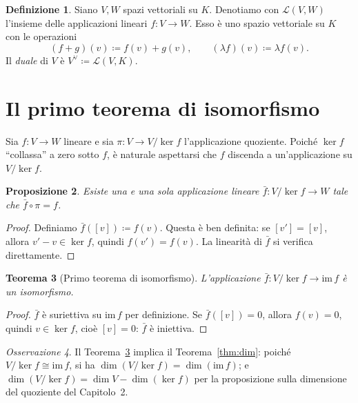 \documentclass[11pt, a4paper]{book}
\theoremstyle{definition}
\newtheorem{definizione}{Definizione}[section]
\theoremstyle{plain}
\newtheorem{teorema}[definizione]{Teorema}
\newtheorem{proposizione}[definizione]{Proposizione}
\theoremstyle{remark}
\newtheorem{osservazione}[definizione]{Osservazione}
\newcommand{\im}{\mathrm{im}\,}
\begin{document}
\begin{defbox}
\begin{definizione}
Siano $V, W$ spazi vettoriali su $K$. Denotiamo con $\mathcal{L}(V, W)$ l'insieme delle applicazioni lineari $f \colon V \to W$. Esso è uno spazio vettoriale su $K$ con le operazioni
\[
  (f+g)(v) \coloneqq f(v) + g(v), \qquad (\lambda f)(v) \coloneqq \lambda f(v).
\]
Il \emph{duale} di $V$ è $V^\vee \coloneqq \mathcal{L}(V, K)$.
\end{definizione}
\end{defbox}

\section{Il primo teorema di isomorfismo}
\label{sec:primoisomorf}

Sia $f \colon V \to W$ lineare e sia $\pi \colon V \to V/\ker f$ l'applicazione quoziente. Poiché $\ker f$ ``collassa'' a zero sotto $f$, è naturale aspettarsi che $f$ discenda a un'applicazione su $V/\ker f$.

\begin{proposizione}
Esiste una e una sola applicazione lineare $\bar{f} \colon V/\ker f \to W$ tale che $\bar{f} \circ \pi = f$.
\end{proposizione}

\begin{proof}
Definiamo $\bar{f}([v]) \coloneqq f(v)$. Questa è ben definita: se $[v'] = [v]$, allora $v' - v \in \ker f$, quindi $f(v') = f(v)$. La linearità di $\bar{f}$ si verifica direttamente.
\end{proof}

\begin{teorema}[Primo teorema di isomorfismo]
\label{thm:iso}
L'applicazione $\bar{f} \colon V/\ker f \to \im f$ è un isomorfismo.
\end{teorema}

\begin{proof}
$\bar{f}$ è suriettiva su $\im f$ per definizione. Se $\bar{f}([v]) = 0$, allora $f(v) = 0$, quindi $v \in \ker f$, cioè $[v] = 0$: $\bar{f}$ è iniettiva.
\end{proof}

\begin{osservazione}
Il Teorema~\ref{thm:iso} implica il Teorema~\ref{thm:dim}: poiché $V/\ker f \cong \im f$, si ha $\dim(V/\ker f) = \dim(\im f)$; e $\dim(V/\ker f) = \dim V - \dim(\ker f)$ per la proposizione sulla dimensione del quoziente del Capitolo~2.
\end{osservazione}
\end{document}
